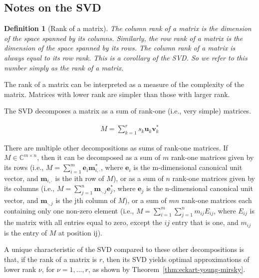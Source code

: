 \documentclass[12pt]{article}
\newtheorem{definition}{Definition}
\begin{document}
\pagebreak
\begin{appendices}

\section{Notes on the SVD}
\label{sec:notesOnTheSVD}

    \begin{definition}[Rank of a matrix]

        The column rank of a matrix is the dimension of the space spanned by
        its columns. Similarly, the row rank of a matrix is the dimension of
        the space spanned by its rows. The column rank of a matrix is always
        equal to its row rank. This is a corollary of the SVD. So we refer to
        this number simply as the rank of a matrix.

        \label{def:rank}
    \end{definition}

    The rank of a matrix can be interpreted as a measure of the complexity of
    the matrix. Matrices with lower rank are simpler than those with larger
    rank.

    The SVD decomposes a matrix as a sum of rank-one (i.e., very simple)
    matrices. 

    \begin{align}
        M = \sum_{k=1}^rs_k\mathbf{u}_k\mathbf{v}_k^*
        \label{eq:svd}
    \end{align}

    There are multiple other decompositions as sums of rank-one matrices. If
    $M\in\mathbb{C}^{m\times n}$, then it can be decomposed as a sum of $m$
    rank-one matrices given by its rows (i.e.,
    $M=\sum_{i=1}^m\mathbf{e}_i\mathbf{m}_{i,\cdot}^*$, where $\mathbf{e}_i$ is
    the m-dimensional canonical unit vector, and $\mathbf{m}_{i,\cdot}$ is the ith row
    of $M$), or as a sum of $n$ rank-one matrices given by its columns (i.e.,
    $M=\sum_{j=1}^n\mathbf{m}_{\cdot,j}\mathbf{e}_j^*$, where $\mathbf{e}_j$ is
    the n-dimensional canonical unit vector, and $\mathbf{m}_{\cdot,j}$ is the jth
    column of $M$), or a sum of $mn$ rank-one matrices each containing only one
    non-zero element (i.e., $M=\sum_{i=1}^m\sum_{j=1}^nm_{ij}E_{ij}$, where
    $E_{ij}$ is the matrix with all entries equal to zero, except the $ij$
    entry that is one, and $m_{ij}$ is the entry of $M$ at position ij).

    A unique characteristic of the SVD compared to these other decompositions
    is that, if the rank of a matrix is $r$, then its SVD yields optimal
    approximations of lower rank $\nu$, for $\nu=1,\ldots,r$, as shown by
    Theorem~\ref{thm:eckart-young-mirsky}.


\end{appendices}
\end{document}
